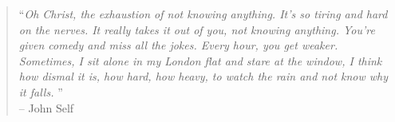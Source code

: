 % 



\vspace*{2cm}
\begin{quote}
\small
``\emph{Oh Christ, the exhaustion of not knowing anything. It’s so tiring and hard on the nerves. 
It really takes it out of you, not knowing anything. You’re given comedy and miss all the jokes. 
Every hour, you get weaker. Sometimes, I sit alone in my London flat and stare at the window, 
I think how dismal it is, how hard, how heavy, to watch the rain and not know why it falls. }''\\
\normalsize
\flushright -- John Self\\
\end{quote}

